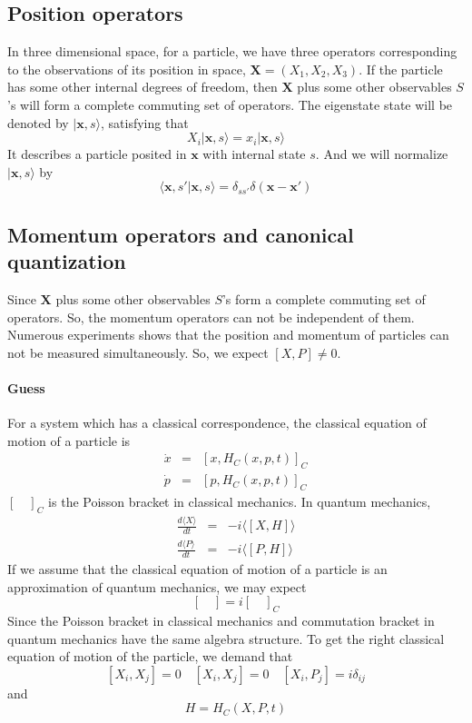 \documentclass{article}
\begin{document}
\subsection{Position operators}
In three dimensional space, for a particle, we have three operators corresponding to the observations of its position in space, $\mathbf{X} = (X_1, X_2, X_3)$. If the particle has some other internal degrees of freedom, then $\mathbf{X}$ plus some other observables $S$'s will form  a complete commuting set of operators. The eigenstate state will be denoted by $| \mathbf{x},s \rangle$, satisfying that
\[X_i | \mathbf{x},s \rangle = x_i | \mathbf{x},s \rangle  \]
It describes a particle posited in $\mathbf{x}$ with internal state $s$. And we will normalize $| \mathbf{x},s \rangle $ by 
\[\langle \mathbf{x},s'| \mathbf{x},s \rangle = \delta_{ss'}\delta(\mathbf{x}-\mathbf{x}')\]

\subsection{Momentum operators and canonical quantization}
Since $\mathbf{X}$ plus some other observables $S$'s form a complete commuting set of operators. So, the momentum operators can not be independent of them. Numerous experiments shows that the position and momentum of particles can not be measured simultaneously. So, we expect $[X,P] \neq 0$.
\paragraph{Guess} 
For a system which has a classical correspondence, the classical equation of motion of a particle is
\begin{eqnarray}
\dot{x} &=& [x,H_C(x,p,t)]_C \nonumber \\
\dot{p} &=& [p,H_C(x,p,t)]_C \nonumber
\end{eqnarray}
$[\quad]_C$ is the Poisson bracket in classical mechanics. In quantum mechanics,
\begin{eqnarray}
\frac{d\langle X \rangle}{dt} &=& -i \langle [X,H] \rangle \nonumber \\
\frac{d\langle P \rangle}{dt} &=& -i \langle [P,H] \rangle \nonumber
\end{eqnarray}
If we assume that the classical equation of motion of a particle is an approximation of quantum mechanics, we may expect
\[[\quad] = i [\quad]_C \]
Since the Poisson bracket in classical mechanics and commutation bracket in quantum mechanics have the same algebra structure. To get the right classical equation of motion of the particle, we demand that
\[[X_i,X_j] = 0 \quad [X_i,X_j] = 0 \quad [X_i,P_j] = i \delta_{ij}\]
and
\[H = H_C(X,P,t)\]
\end{document}
